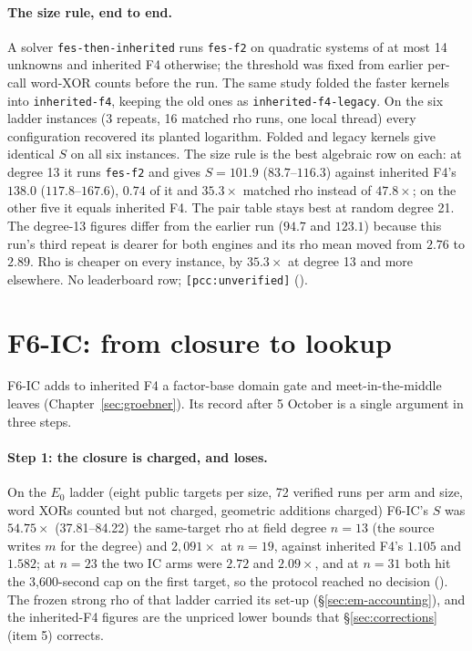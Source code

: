 \paragraph{The size rule, end to end.} A solver \texttt{fes-then-inherited}
runs \texttt{fes-f2} on quadratic systems of at most 14 unknowns and
inherited F4 otherwise; the threshold was fixed from earlier per-call
word-XOR counts before the run. The same study folded the faster kernels
into \texttt{inherited-f4}, keeping the old ones as
\texttt{inherited-f4-legacy}. On the six ladder instances (3 repeats, 16
matched rho runs, one local thread) every configuration recovered its
planted logarithm. Folded and legacy kernels give identical $S$ on all six
instances. The size rule is the best algebraic row on each: at degree 13 it
runs \texttt{fes-f2} and gives $S=101.9$ ($83.7$--$116.3$) against
inherited F4's $138.0$ ($117.8$--$167.6$), $0.74$ of it and $35.3\times$
matched rho instead of $47.8\times$; on the other five it equals inherited
F4. The pair table stays best at random degree 21. The degree-13 figures
differ from the earlier run ($94.7$ and $123.1$) because this run's third
repeat is dearer for both engines and its rho mean moved from $2.76$ to
$2.89$. Rho is cheaper on every instance, by $35.3\times$ at degree 13 and
more elsewhere. No leaderboard row; \texttt{[pcc:unverified]}
().

\section{F6-IC: from closure to lookup}\label{sec:bo-f6}

F6-IC adds to inherited F4 a factor-base domain gate and meet-in-the-middle
leaves (Chapter~\ref{sec:groebner}). Its record after 5 October is a single
argument in three steps.

\paragraph{Step 1: the closure is charged, and loses.} On the $E_0$ ladder
(eight public targets per size, 72 verified runs per arm and size, word XORs
counted but not charged, geometric additions charged) F6-IC's $S$ was
$54.75\times$ (37.81--84.22) the same-target rho at field degree $n=13$
(the source writes $m$ for the degree) and $2{,}091\times$ at $n=19$, against
inherited F4's $1.105$ and $1.582$; at $n=23$ the two IC arms were $2.72$ and
$2.09\times$, and at $n=31$ both hit the 3{,}600-second
cap on the first target, so the protocol reached no decision
(). The frozen strong
rho of that ladder carried its set-up (\S\ref{sec:em-accounting}), and the
inherited-F4 figures are the unpriced lower bounds that
\S\ref{sec:corrections} (item 5) corrects.

